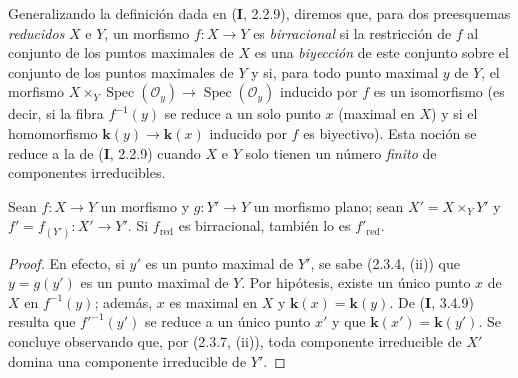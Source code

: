 \begin{env}[6.15.4]
Generalizando la definición dada en (\textbf I, 2.2.9), diremos que,
para dos preesquemas \emph{reducidos} $X$ e $Y$, un morfismo
$f:X\to Y$ es \emph{birracional} si la restricción de $f$ al
conjunto de los puntos maximales de $X$ es una \emph{biyección} de
este conjunto sobre el conjunto de los puntos maximales de $Y$
y si, para todo punto maximal $y$ de $Y$, el morfismo
$X\times_Y\operatorname{Spec}(\mathcal O_y)\to\operatorname{Spec}(\mathcal O_y)$
inducido por $f$ es un isomorfismo (es decir, si la fibra
$f^{-1}(y)$ se reduce a un solo punto $x$ (maximal en $X$)
y si el homomorfismo $\boldsymbol{k}(y)\to \boldsymbol{k}(x)$ inducido por $f$ es
biyectivo). Esta noción se reduce a la de (\textbf I, 2.2.9) cuando
$X$ e $Y$ solo tienen un número \emph{finito} de componentes
irreducibles.
\end{env}

\begin{lemma}[6.15.4.1]
\label{IV.2.s6.15.4.1-fr}
Sean $f:X\to Y$ un morfismo y $g:Y'\to Y$ un morfismo plano;
sean $X'=X\times_Y Y'$ y $f'=f_{(Y')}:X'\to Y'$. Si
$f_{\mathrm{red}}$ es birracional, también lo es
$f'_{\mathrm{red}}$.
\end{lemma}

\begin{proof}
En efecto, si $y'$ es un punto maximal de $Y'$, se sabe
(2.3.4, (ii)) que $y=g(y')$ es un punto maximal de $Y$.
Por hipótesis, existe un único punto $x$ de $X$ en
$f^{-1}(y)$; además, $x$ es maximal en $X$ y
$\boldsymbol{k}(x)=\boldsymbol{k}(y)$. De (\textbf I, 3.4.9) resulta que $f'^{-1}(y')$ se
reduce a un único punto $x'$ y que $\boldsymbol{k}(x')=\boldsymbol{k}(y')$.
Se concluye observando que, por (2.3.7, (ii)), toda
componente irreducible de $X'$ domina una componente
irreducible de $Y'$.
\end{proof}
